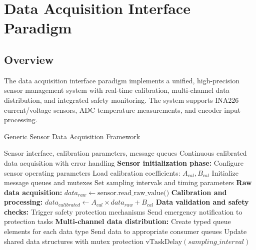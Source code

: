 \documentclass{article}
\begin{document}
\section{Data Acquisition Interface Paradigm}

\subsection{Overview}

The data acquisition interface paradigm implements a unified, high-precision sensor management system with real-time calibration, multi-channel data distribution, and integrated safety monitoring. The system supports INA226 current/voltage sensors, ADC temperature measurements, and encoder input processing.

\begin{algorithm}
\caption{Generic Sensor Data Acquisition Framework}
\label{alg:generic_sensor_framework}
\begin{algorithmic}[1]
\REQUIRE Sensor interface, calibration parameters, message queues
\ENSURE Continuous calibrated data acquisition with error handling
\STATE \textbf{Sensor initialization phase:}
\STATE Configure sensor operating parameters
\STATE Load calibration coefficients: $A_{cal}, B_{cal}$
\STATE Initialize message queues and mutexes
\STATE Set sampling intervals and timing parameters
\STATE
{}
    \STATE \textbf{Raw data acquisition:}
    \STATE $data_{raw} \leftarrow \text{sensor.read\_raw\_value()}$
    \STATE
    \STATE \textbf{Calibration and processing:}
    \STATE $data_{calibrated} \leftarrow A_{cal} \times data_{raw} + B_{cal}$
    \STATE
    \STATE \textbf{Data validation and safety checks:}
        \STATE Trigger safety protection mechanisms
        \STATE Send emergency notification to protection tasks
    \ENDIF
    \STATE
    \STATE \textbf{Multi-channel data distribution:}
    \STATE Create typed queue elements for each data type
    \STATE Send data to appropriate consumer queues
    \STATE Update shared data structures with mutex protection
    \STATE
    \STATE $\text{vTaskDelay}(sampling\_interval)$
\ENDWHILE
\end{algorithmic}
\end{algorithm}
\end{document}
